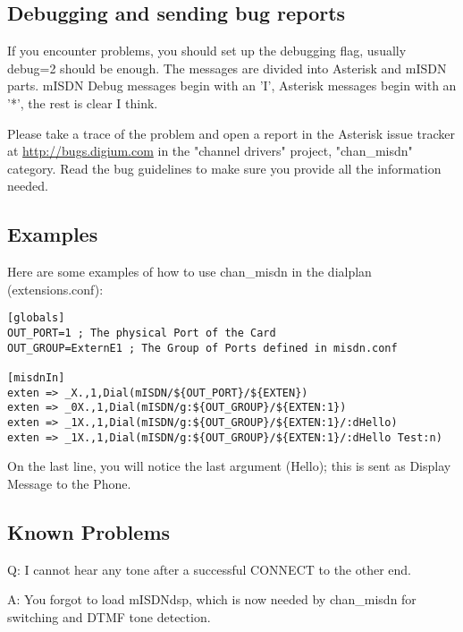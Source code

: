 \subsection{Debugging and sending bug reports}

If you encounter problems, you should set up the debugging flag, usually
debug=2 should be enough. The messages are divided into Asterisk and mISDN
parts.  mISDN Debug messages begin with an 'I', Asterisk messages begin with
an '*', the rest is clear I think.

Please take a trace of the problem and open a report in the Asterisk issue
tracker at \url{http://bugs.digium.com} in the "channel drivers" project,
"chan\_misdn" category. Read the bug guidelines to make sure you
provide all the information needed.


\subsection{Examples}

Here are some examples of how to use chan\_misdn in the dialplan
(extensions.conf):

\begin{astlisting}
\begin{verbatim}
[globals]
OUT_PORT=1 ; The physical Port of the Card
OUT_GROUP=ExternE1 ; The Group of Ports defined in misdn.conf

[misdnIn]
exten => _X.,1,Dial(mISDN/${OUT_PORT}/${EXTEN})
exten => _0X.,1,Dial(mISDN/g:${OUT_GROUP}/${EXTEN:1})
exten => _1X.,1,Dial(mISDN/g:${OUT_GROUP}/${EXTEN:1}/:dHello)
exten => _1X.,1,Dial(mISDN/g:${OUT_GROUP}/${EXTEN:1}/:dHello Test:n)
\end{verbatim}
\end{astlisting}

On the last line, you will notice the last argument (Hello); this is sent
as Display Message to the Phone.

\subsection{Known Problems}

Q: I cannot hear any tone after a successful CONNECT to the other end.

A: You forgot to load mISDNdsp, which is now needed by chan\_misdn for switching
and DTMF tone detection.

